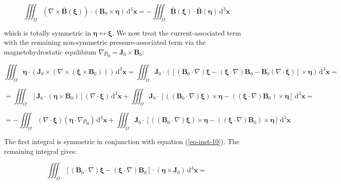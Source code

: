 \begin{equation}
    \iiint_\Omega(\nabla\times\bar{\mathbf{B}}(\boldsymbol{\xi}))\cdot(\mathbf{B}_0\times\boldsymbol{\eta})\,\mathrm{d}^3\mathbf{x}=-\iiint_\Omega\bar{\mathbf{B}}(\boldsymbol{\xi})\cdot\bar{\mathbf{B}}(\boldsymbol{\eta})\,\mathrm{d}^3\mathbf{x}
\end{equation}

which is totally symmetric in $\boldsymbol{\eta}\leftrightarrow\boldsymbol{\xi}$. We now treat the current-associated term with the remaining non-symmetric pressure-associated term via the magnetohydrostatic equilibium $\nabla p_0=\mathbf{J}_0\times\mathbf{B}_0$:

\begin{equation*}
    \iiint_\Omega\boldsymbol{\eta}\cdot(\mathbf{J}_0\times(\nabla\times(\boldsymbol{\xi}\times\mathbf{B}_0)))\,\mathrm{d}^3\mathbf{x}=\iiint_\Omega\mathbf{J}_0\cdot\left(\left[(\mathbf{B}_0\cdot\nabla)\boldsymbol{\xi}-(\boldsymbol{\xi}\cdot\nabla)\mathbf{B}_0-\mathbf{B}_0(\nabla\cdot\boldsymbol{\xi})\right]\times\boldsymbol{\eta}\right)\,\mathrm{d}^3\mathbf{x}=
\end{equation*}

\begin{equation*}
    =\iiint_\Omega\left[\mathbf{J}_0\cdot(\boldsymbol{\eta}\times\mathbf{B}_0)\right](\nabla\cdot\boldsymbol{\xi})\,\mathrm{d}^3\mathbf{x}+\iiint_\Omega\mathbf{J}_0\cdot\left[\left((\mathbf{B}_0\cdot\nabla)\boldsymbol{\xi}\right)\times\boldsymbol{\eta}-\left((\boldsymbol{\xi}\cdot\nabla)\mathbf{B}_0\right)\times\boldsymbol{\eta}\right]\,\mathrm{d}^3\mathbf{x}=
\end{equation*}

\begin{equation}
    =-\iiint_\Omega(\nabla\cdot\boldsymbol{\xi})(\boldsymbol{\eta}\cdot\nabla p_0)\,\mathrm{d}^3\mathbf{x}+\iiint_\Omega\mathbf{J}_0\cdot\left[\left((\mathbf{B}_0\cdot\nabla)\boldsymbol{\xi}\right)\times\boldsymbol{\eta}-\left((\boldsymbol{\xi}\cdot\nabla)\mathbf{B}_0\right)\times\boldsymbol{\eta}\right]\,\mathrm{d}^3\mathbf{x}
\end{equation}

The first integral is symmetric in conjunction with equation (\ref{eq-inst-10}). The remaining integral gives:

\begin{equation*}
    \iiint_\Omega\left[(\mathbf{B}_0\cdot\nabla)\boldsymbol{\xi}-(\boldsymbol{\xi}\cdot\nabla)\mathbf{B}_0\right]\cdot(\boldsymbol{\eta}\times\mathbf{J}_0)\,\mathrm{d}^3\mathbf{x}=
\end{equation*}

